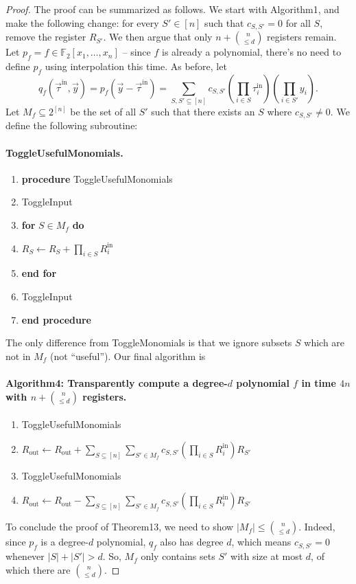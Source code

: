 \begin{proof}
The proof can be summarized as follows. We start with Algorithm1, and make the following change: for every $S'\in[n]$ such that $c_{S,S'}=0$ for all $S$, remove the register $R_{S'}$. We then argue that only $n+\binom n{\leq d}$ registers remain.
Let $p_f=f\in\mathbb F_2[x_1,\ldots,x_n]$ – since $f$ is already a polynomial, there's no need to define $p_f$ using interpolation this time. As before, let
\[q_f(\vec\tau^{\mathrm{in}},\vec y)=p_f(\vec y-\vec\tau^{\mathrm{in}})=\sum_{S,S'\subseteq[n]}c_{S,S'}\left(\prod_{i\in S}\tau_i^{\mathrm{in}}\right)\left(\prod_{i\in S'}y_i\right).\]
Let $M_f\subseteq2^{[n]}$ be the set of all $S'$ such that there exists an $S$ where $c_{S,S'}\neq0$. We define the following subroutine:
\paragraph{ToggleUsefulMonomials.}
\begin{enumerate}[label=\arabic*:]
\item \textbf{procedure} ToggleUsefulMonomials
\item ToggleInput
\item \textbf{for} $S\in M_f$ \textbf{do}
\item $R_S\leftarrow R_S+\prod_{i\in S}R_i^{\mathrm{in}}$
\item \textbf{end for}
\item ToggleInput
\item \textbf{end procedure}
\end{enumerate}
The only difference from ToggleMonomials is that we ignore subsets $S$ which are not in $M_f$ (not ``useful''). Our final algorithm is
\paragraph{Algorithm4: Transparently compute a degree-$d$ polynomial $f$ in time $4n$ with $n+\binom n{\leq d}$ registers.}
\begin{enumerate}[label=\arabic*:]
\item ToggleUsefulMonomials
\item $R_{\mathrm{out}}\leftarrow R_{\mathrm{out}}+\sum_{S\subseteq[n]}\sum_{S'\in M_f}c_{S,S'}(\prod_{i\in S}R_i^{\mathrm{in}})R_{S'}$
\item ToggleUsefulMonomials
\item $R_{\mathrm{out}}\leftarrow R_{\mathrm{out}}-\sum_{S\subseteq[n]}\sum_{S'\in M_f}c_{S,S'}(\prod_{i\in S}R_i^{\mathrm{in}})R_{S'}$
\end{enumerate}
To conclude the proof of Theorem13, we need to show $|M_f|\leq\binom n{\leq d}$. Indeed, since $p_f$ is a degree-$d$ polynomial, $q_f$ also has degree $d$, which means $c_{S,S'}=0$ whenever $|S|+|S'|>d$. So, $M_f$ only contains sets $S'$ with size at most $d$, of which there are $\binom n{\leq d}$.
\end{proof}
